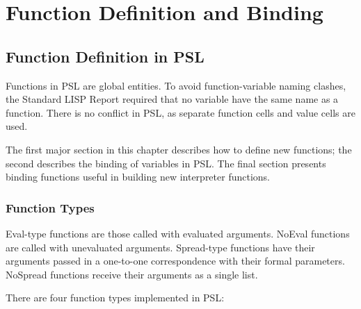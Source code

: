 \chapter*{Function Definition and Binding}

\section{Function Definition in PSL}

Functions in PSL are global entities.  To  avoid
function-variable  naming  clashes,  the  Standard  LISP  Report
required  that  no  variable  have  the same name as a function.
There is no conflict in PSL, as separate function cells and
value cells are used.

  The  first  major  section  in  this  chapter describes how to
define new  functions;  the  second  describes  the  binding  of
variables  in PSL.  The final section presents binding functions
useful in building new interpreter functions.

\subsection{Function Types}

  Eval-type functions are those called with evaluated arguments.
NoEval  functions  are  called   with   unevaluated   arguments.
Spread-type   functions   have   their  arguments  passed  in  a
one-to-one  correspondence   with   their   formal   parameters.
NoSpread functions receive their arguments as a single list.

There are four function types implemented in PSL:\\

